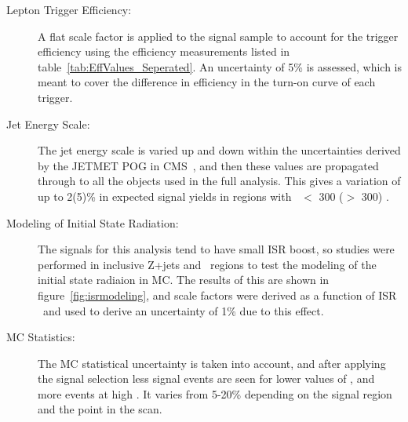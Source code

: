 \begin{description}
\item[Lepton Trigger Efficiency:] 
  A flat scale factor is applied to the signal sample to account for the trigger efficiency using the efficiency measurements listed in table~\ref{tab:EffValues_Seperated}.
  An uncertainty of 5\% is assessed, which is meant to cover the difference in efficiency in the turn-on curve of each trigger.

\item[Jet Energy Scale:] 
  The jet energy scale is varied up and down within the uncertainties derived by the JETMET POG in CMS~\cite{cmsjetcal}\cite{jercworkgroup},
  and then these values are propagated through to all the objects used in the full analysis. 
  This gives a variation of up to 2(5)\% in expected signal yields in regions with \MET\ $<$ 300 ($>$ 300) \gev. 

\item[Modeling of Initial State Radiation:] 
  The signals for this analysis tend to have small ISR boost, so studies were performed in inclusive Z+jets and \ttbar\ regions to test the modeling of the initial state radiaion in MC.
  The results of this are shown in figure~\ref{fig:isrmodeling}, and scale factors were derived as a function of ISR \pt\ and used to derive an uncertainty of 1\% due to this effect.

\item[MC Statistics:] 
  The MC statistical uncertainty is taken into account, and after applying the signal selection less signal events are seen for lower values of \MET, and more events at high \MET.
  It varies from 5-20\% depending on the signal region and the point in the scan.

\end{description}

